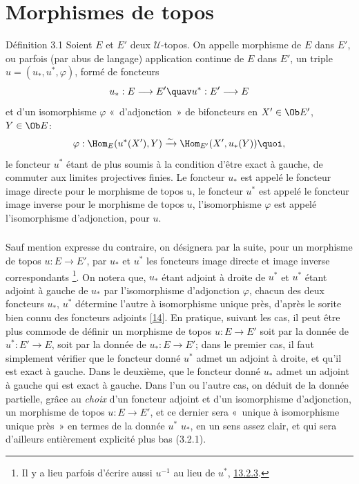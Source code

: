 \documentclass[10pt]{../fichiers-configuration-latex/smfart}
\begin{document}
\section{Morphismes de topos}\pageoriginale

\begin{enonce*}{Définition 3.1}
Soient $E$ et $E'$ deux $𝒰$-topos. On appelle morphisme de
$E$ dans $E'$, ou parfois (par abus de langage) application continue
de $E$ dans $E'$, un triple $u=(u_{\ast}, u^{\ast},\varphi)$,
formé de foncteurs
$$
u_{\ast}:E\longrightarrow E'\quav u^{\ast}:E'\longrightarrow E
$$
et d'un isomorphisme $\varphi$ « d'adjonction »  de bifoncteurs
en $X'\in \Ob E'$, $Y\in \Ob E$:
$$
\varphi:\Hom_E (u^{\ast}(X'),Y)\xrightarrow{\sim} \Hom_{E'}(X',
u_{\ast}(Y)){\quoi},
$$
le foncteur $u^{\ast}$ étant de plus soumis à la condition
d'être exact à gauche, \ie de commuter aux limites projectives
finies. Le foncteur $u_{\ast}$ est appelé le foncteur image
directe pour le morphisme de topos $u$, le foncteur $u^{\ast}$ est
appelé le foncteur image inverse pour le morphisme de topos $u$,
l'isomorphisme $\varphi$ est appelé l'isomorphisme d'adjonction,
pour $u$.
\end{enonce*}

\setcounter{subsection}{1}
\subsubsection{}
Sauf mention expresse du contraire, on désignera par la suite,
pour un morphisme de topos $u:E\rightarrow E'$, par $u_{\ast}$ et
$u^{\ast}$ les foncteurs image directe et image inverse
correspondants \footnote[1]{Il y a lieu parfois d'écrire aussi
$u^{-1}$ au lieu de $u^{\ast}$, \cf \hyperref[IV.subsubsec13.2.3]{13.2.3}.}. On notera que, $u_{\ast}$
étant adjoint à droite de $u^{\ast}$ et $u^{\ast}$ étant
adjoint à gauche de $u_{\ast}$ par l'isomorphisme d'adjonction
$\varphi$, chacun des deux foncteurs $u_{\ast}$, $u^{\ast}$
détermine l'autre à isomorphisme unique près, d'après le
sorite bien connu des foncteurs adjoints [\hyperref[IV.sec14]{14}]. En
pratique, suivant les cas, il peut être plus commode de définir
un morphisme de topos $u:E\rightarrow E'$ soit par la donnée de
$u^{\ast}:E'\rightarrow E$, soit par la donnée de
$u_{\ast}:E\rightarrow E'$; dans le premier cas, il faut simplement
vérifier que le foncteur donné $u^{\ast}$ admet\pageoriginale
un adjoint à droite, et qu'il est exact à gauche. Dans le
deuxième, que le foncteur donné $u_{\ast}$ admet un adjoint à
gauche qui est exact à gauche. Dans l'un ou l'autre cas, on
déduit de la donnée partielle, grâce au \emph{choix} d'un
foncteur adjoint et d'un isomorphisme d'adjonction, un morphisme de
topos $u:E\rightarrow E'$, et ce dernier sera « unique à
isomorphisme unique près »  en termes de la donnée $u^{\ast}$
\resp $u_{\ast}$, en un sens assez clair, et qui sera d'ailleurs
entièrement explicité plus bas (3.2.1).
\end{document}

